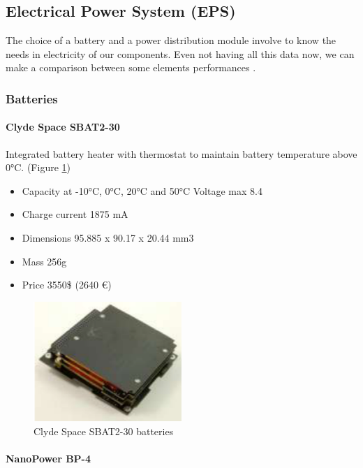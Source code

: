 \subsection{Electrical Power System (EPS)}

The choice of a battery and a power distribution module involve to know the needs
in electricity of our components. Even not having all this data now, we
can make a comparison between some elements performances
\cite{isis_solar_panels}\cite{LMRST-Sat}\cite{Usman}.

\subsubsection{Batteries}

\paragraph{Clyde Space SBAT2-30}

Integrated battery heater with thermostat to maintain battery temperature above 0°C.
(Figure \ref{fig:clyde_space_sbat2})
\begin{itemize}
	\item Capacity at -10°C, 0°C, 20°C and 50°C Voltage max 8.4
	\item Charge current 1875 mA
	\item Dimensions 95.885 x 90.17 x 20.44 mm3
	\item Mass 256g
	\item Price 3550\$ (2640 \euro)
\end{itemize}

\begin{figure}[h]
	\centering
	\includegraphics[width=0.5\textwidth]{img/clyde_space_sbat2-30.png}
	\caption{Clyde Space SBAT2-30 batteries}
	\label{fig:clyde_space_sbat2}
\end{figure}

\paragraph{NanoPower BP-4}

